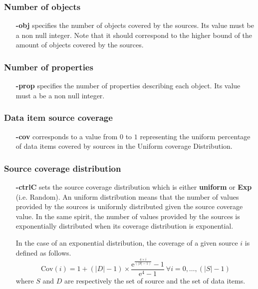 \documentclass[a4paper,10pt]{scrartcl}
\newcommand{\cov}[1]{\ensuremath{\mathrm{Cov}(#1)}}
\newcommand{\expo}[1]{\ensuremath{\mathrm{e}^{#1}}}
\begin{document}
\subsubsection{Number of objects}
 \begin{itemize}
 \item[\textbf{-obj}] specifies the number of objects covered by the sources. Its value must be a non null integer.
 Note that it should correspond to the higher bound of the amount of objects covered by the sources.
 \end{itemize}
\subsubsection{Number of properties}
 \begin{itemize}
 \item[\textbf{-prop}] specifies the number of properties describing each object. Its value must a be a non null integer.
 \end{itemize}
 \subsubsection{Data item source coverage}
 \begin{itemize}
 \item[\textbf{-cov}] corresponds to a value from $0$ to $1$ representing the uniform percentage 
 of data items covered by sources in the Uniform coverage Distribution.
\end{itemize}
\subsubsection{Source coverage distribution}
\begin{itemize}
\item[\textbf{-ctrlC}] sets the source coverage distribution which is either \textbf{uniform} or \textbf{Exp} (i.e. Random).
 An uniform distribution means that the number of values provided by the sources is uniformly
 distributed given the source coverage value. In the same spirit, the number of values provided 
 by the sources is exponentially distributed when its coverage distribution is exponential.
 
 In the case of an exponential distribution, the coverage of a given source $i$ is defined as follows.
 \[
  \cov{i} = 1 + (|D|-1)\times \frac{\expo{\frac{4\times i}{(|S|-1)}} - 1}{\expo{4}-1}~\forall i=0,\ldots,(|S| -1)
 \]
where $S$ and $D$ are respectively the set of source and the set of data items. 
 
\end{itemize}
\end{document}
